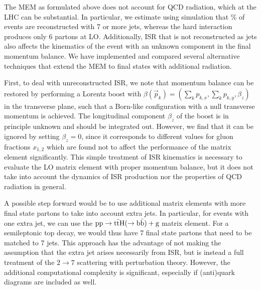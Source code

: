 The MEM as formulated above does not account for QCD radiation, which at the LHC can be substantial. In particular, we estimate using simulation that \fix\% of \ttHbb events are reconstructed with 7 or more jets, whereas the hard interaction produces only 6 partons at LO. Additionally, ISR that is not reconstructed as jets also affects the kinematics of the event with an unknown component in the final momentum balance. We have implemented and compared several alternative techniques that extend the MEM to final states with additional radiation.

First, to deal with unreconstructed ISR, we note that momentum balance can be restored by performing a Lorentz boost with $\beta(\vec{p}_k) = (\sum_k p_{k,x}, \sum_k p_{k,y}, \beta_z)$ in the transverse plane, such that a Born-like configuration with a null transverse momentum is achieved. The longitudinal component $\beta_z$ of the boost is in principle unknown and should be integrated out. However, we find that it can be ignored by setting $\beta_z = 0$, since it corresponds to different values for gluon fractions $x_{1,2}$ which are found not to affect the performance of the matrix element significantly. This simple treatment of ISR kinematics is necessary to evaluate the LO matrix element with proper momentum balance, but it does not take into account the dynamics of ISR production nor the properties of QCD radiation in general.

A possible step forward would be to use additional matrix elements with more final state partons to take into account extra jets. In particular, for events with one extra jet, we can use the $\mathrm{pp} \rightarrow \mathrm{t} \bar{\mathrm{t}} \mathrm{H} (\rightarrow \mathrm{b}\bar{\mathrm{b}}) + \mathrm{g}$ matrix element. For a semileptonic top decay, we would thus have 7 final state partons that need to be matched to 7 jets. This approach has the advantage of not making the assumption that the extra jet arises necessarily from ISR, but is instead a full treatment of the $2 \rightarrow 7$ scattering with perturbation theory. However, the additional computational complexity is significant, especially if (anti)quark diagrams are included as well.

